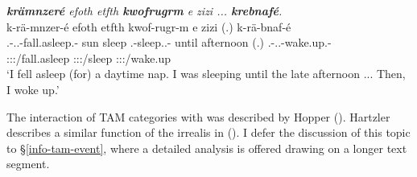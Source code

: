 \begin{exe}
	\ex \emph{\textbf{krämnzeré} efoth etfth \textbf{kwofrugrm} e zizi ... \textbf{krebnafé}.}\\
	\glll k-rä-mnzer-é efoth etfth kwof-rugr-m e zizi (.) k-rä-bnaf-é\\
	\M.\Bet-\Irr.\Vc.\Ndu-fall.asleep.\Rs-\Fsg{} sun sleep \Fsg.\Betatwo-sleep.\Ext.\Ndu-\Dur{} until afternoon (.) \M.\Bet-\Irr.\Vc.\Ndu-wake.up.\Rs-\Fsg{}\\
	\footnotesize{\Fsg:\Sbj:\Irr:\Pfv/fall.asleep} {} {} \footnotesize{\Fsg:\Sbj:\Pst:\Dur/sleep} {} {} {} \footnotesize{\Fsg:\Sbj:\Irr:\Pfv/wake.up}\\
	\trans `I fell asleep (for) a daytime nap. I was sleeping until the late afternoon ... Then, I woke up.'
	\label{ex377}
\end{exe}

The interaction of TAM categories with  was described by Hopper (\citeyear{Hopper:1979us}). Hartzler describes a similar function of the irrealis  in  (\citeyear{Hartzler:1983wm}). I defer the discussion of this topic to \S{}\ref{info-tam-event}, where a detailed analysis is offered drawing on a longer text segment.
